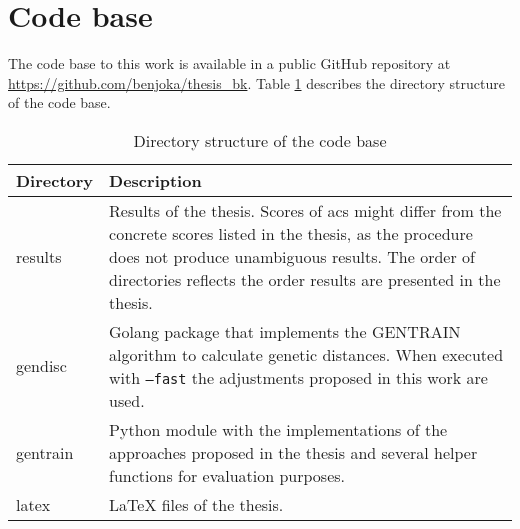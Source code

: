 \section{Code base}
The code base to this work is available in a public GitHub repository at \url{https://github.com/benjoka/thesis_bk}. Table \ref{table:code_base_structure} describes the directory structure of the code base.

\renewcommand{\arraystretch}{1.5}
\begin{table}[H]
\centering
\caption{Directory structure of the code base}
\label{table:code_base_structure}
\begin{tabular}{>{\centering\arraybackslash}p{}|>{\centering\arraybackslash}p{}}
Directory & Description \\
\hline\hline
results & Results of the thesis. Scores of \acrshort{acs} might differ from the concrete scores listed in the thesis, as the procedure does not produce unambiguous results. The order of directories reflects the order results are presented in the thesis. \\
\hline
gendisc & Golang package that implements the GENTRAIN algorithm to calculate genetic distances. When executed with \texttt{--fast} the adjustments proposed in this work are used. \\
\hline
gentrain & Python module with the implementations of the approaches proposed in the thesis and several helper functions for evaluation purposes. \\
\hline
latex & LaTeX files of the thesis. \\
\end{tabular}
\end{table}
\clearpage
\setcounter{table}{0}
